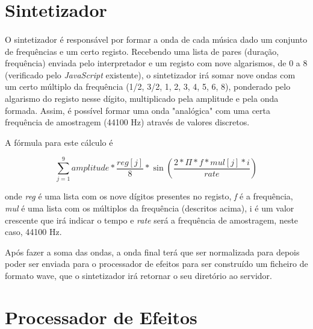 \documentclass[11pt,openany,twoside]{report}
\begin{document}
\section{Sintetizador}
\paragraph{ } O sintetizador é responsável por formar a onda de cada música dado um conjunto de frequências e um certo registo. Recebendo uma lista de pares (duração, frequência) enviada pelo interpretador e um registo com nove algarismos, de 0 a 8 (verificado pelo \textit{JavaScript} existente), o sintetizador irá somar nove ondas com um certo múltiplo da frequência (1/2, 3/2, 1, 2, 3, 4, 5, 6, 8), ponderado pelo algarismo do registo nesse dígito, multiplicado pela amplitude e pela onda formada. Assim, é possível formar uma onda "analógica" com uma certa frequência de amostragem (44100 Hz) através de valores discretos.

A fórmula para este cálculo é

\begin{equation}
 \displaystyle\sum_{j=1}^{9} amplitude * \frac{reg[j]}{8} * \sin(\frac{2*\Pi*f*mul[j]*i}{rate})
 \label{F1} 
\end{equation} 

onde \textit{reg} é uma lista com os nove dígitos presentes no registo, \textit{f} é a frequência, \textit{mul} é uma lista com os múltiplos da frequência (descritos acima), i é um valor crescente que irá indicar o tempo e \textit{rate} será a frequência de amostragem, neste caso, 44100 Hz.


Após fazer a soma das ondas, a onda final terá que ser normalizada para depois poder ser enviada para o processador de efeitos para ser construído um ficheiro de formato \ac{wave}, que o sintetizador irá retornar o seu diretório ao servidor.

\section{Processador de Efeitos}
\end{document}

